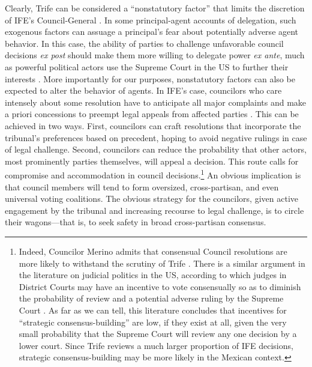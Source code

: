 \documentclass[12 pt, letter]{article}
\begin{document}
Clearly, {\sc Trife} can be considered a ``nonstatutory factor''
that limits the discretion of IFE's Council-General
\citep{Huber2002}. In some principal-agent accounts of delegation,
such exogenous factors can assuage a principal's fear about
potentially adverse agent behavior.  In this case, the ability of
parties to challenge unfavorable council decisions \emph{ex post}
should make them more willing to delegate power \emph{ex ante}, much
as powerful political actors use the Supreme Court in the US to
further their interests \citep{Clayton2002, Mcnollgast1999}. More
importantly for our purposes, nonstatutory factors can also be
expected to alter the behavior of agents.  In IFE's case, councilors
who care intensely about some resolution have to anticipate all
major complaints and make a priori concessions to preempt legal
appeals from affected parties \citep[cf.][]{GelySpiller1990}. This
can be achieved in two ways. First, councilors can craft resolutions
that incorporate the tribunal's preferences based on precedent,
hoping to avoid negative rulings in case of legal challenge. Second,
councilors can reduce the probability that other actors, most
prominently parties themselves, will appeal a decision. This route
calls for compromise and accommodation in council
decisions.\footnote{Indeed, Councilor Merino admits that consensual
Council resolutions are more likely to withstand the scrutiny of
{\sc Trife}  \citep{Merino1999}.  There is a similar argument in the
literature on judicial politics in the US, according to which judges
in District Courts may have an incentive to vote consensually so as
to diminish the probability of review and a potential adverse ruling
by the Supreme Court \citep{Cameron2000, Lax2003, Songer1994}.  As
far as we can tell, this literature concludes that incentives for
``strategic consensus-building'' are low, if they exist at all,
given the very small probability that the Supreme Court will review
any one decision by a lower court.  Since {\sc Trife} reviews a much
larger proportion of IFE decisions, strategic consensus-building may
be more likely in the Mexican context.} An obvious implication is
that council members will tend to form oversized, cross-partisan,
and even universal voting coalitions. The obvious strategy for the
councilors, given active engagement by the tribunal and increasing
recourse to legal challenge, is to circle their wagons---that is, to
seek safety in broad cross-partisan consensus.
\end{document}
